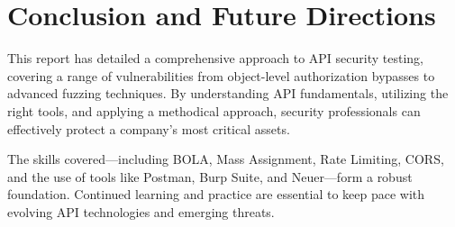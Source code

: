 \documentclass[12pt]{article}
\begin{document}
\section{Conclusion and Future Directions}
This report has detailed a comprehensive approach to API security testing, covering a range of
vulnerabilities from object-level authorization bypasses to advanced fuzzing techniques. By
understanding API fundamentals, utilizing the right tools, and applying a methodical approach,
security professionals can effectively protect a company's most critical assets.

The skills covered—including BOLA, Mass Assignment, Rate Limiting, CORS, and the use of
tools like Postman, Burp Suite, and Neuer—form a robust foundation. Continued learning and
practice are essential to keep pace with evolving API technologies and emerging threats.
\end{document}
